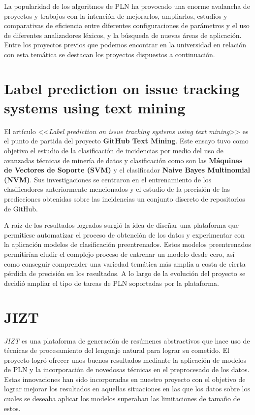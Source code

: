 
La popularidad de los algoritmos de PLN ha provocado una enorme avalancha de proyectos y trabajos con la intención de mejorarlos, ampliarlos, estudios y comparativas de eficiencia entre diferentes configuraciones de parámetros y el uso de diferentes analizadores léxicos, y la búsqueda de nuevas áreas de aplicación. Entre los proyectos previos que podemos encontrar en la universidad en relación con esta temática se destacan los proyectos dispuestos a continuación.

\section{Label prediction on issue tracking systems using text mining} \label{sec:labelpredictionarticle}
El artículo <<\emph{Label prediction on issue tracking systems using text mining}>> \cite{ related_works:label_prediction} es el punto de partida del proyecto \textbf{GitHub Text Mining}. Este ensayo tuvo como objetivo el estudio de la clasificación de incidencias por medio del uso de avanzadas técnicas de minería de datos y clasificación como son las \textbf{Máquinas de Vectores de Soporte (SVM)} y el clasificador \textbf{Naive Bayes Multinomial (NVM)}. Sus investigaciones se centraron en el entrenamiento de los clasificadores anteriormente mencionados y el estudio de la precisión de las predicciones obtenidas sobre las incidencias un conjunto discreto de repositorios de GitHub.

A raíz de los resultados logrados surgió la idea de diseñar una plataforma que permitiese automatizar el proceso de obtención de los datos y experimentar con la aplicación modelos de clasificación preentrenados. Estos modelos preentrenados permitirían eludir el complejo proceso de entrenar un modelo desde cero, así como conseguir comprender una variedad temática más amplia a costa de cierta pérdida de precisión en los resultados. A lo largo de la evolución del proyecto se decidió ampliar el tipo de tareas de PLN soportadas por la plataforma.

\section{JIZT}
\emph{JIZT} \cite{related_works:jizt} es una plataforma de generación de resúmenes abstractivos que hace uso de técnicas de procesamiento del lenguaje natural para lograr su cometido. El proyecto logró ofrecer unos buenos resultados mediante la aplicación de modelos de PLN y la incorporación de novedosas técnicas en el preprocesado de los datos. Estas innovaciones han sido incorporadas en nuestro proyecto con el objetivo de lograr mejorar los resultados en aquellas situaciones en las que los datos sobre los cuales se deseaba aplicar los modelos superaban las limitaciones de tamaño de estos.

